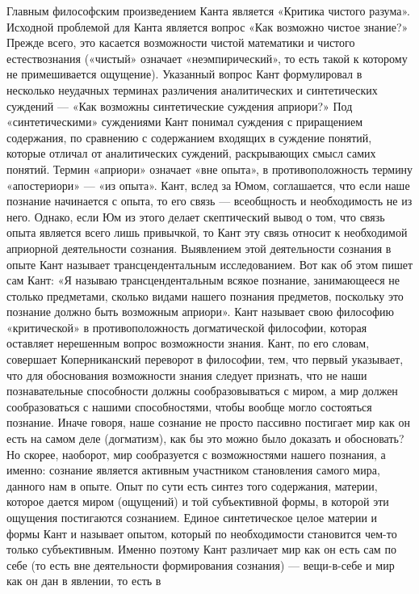 \documentclass[12pt]{article}
\begin{document}
Главным философским произведением Канта является «Критика чистого разума». Исходной проблемой для
Канта  является  вопрос  «Как  возможно  чистое  знание?»  Прежде  всего,  это  касается  возможности  чистой
математики и чистого естествознания («чистый» означает «неэмпирический», то есть такой к которому не
примешивается  ощущение).  Указанный  вопрос  Кант  формулировал  в  несколько  неудачных  терминах
различения аналитических и синтетических суждений — «Как возможны синтетические суждения априори?»
Под  «синтетическими»  суждениями  Кант  понимал  суждения  с  приращением  содержания,  по  сравнению  с
содержанием  входящих в  суждение понятий, которые  отличал от  аналитических суждений, раскрывающих
смысл самих понятий. Термин «априори» означает «вне опыта», в противоположность термину «апостериори»
— «из опыта». Кант, вслед за Юмом, соглашается, что если наше познание начинается с опыта, то его связь —
всеобщность и необходимость не из него. Однако, если Юм из этого делает скептический вывод о том, что связь
опыта является всего лишь привычкой, то Кант эту связь относит к необходимой априорной деятельности
сознания. Выявлением этой деятельности сознания в опыте Кант называет трансцендентальным исследованием.
Вот как об этом пишет сам Кант: «Я называю трансцендентальным всякое познание, занимающееся не столько
предметами, сколько видами нашего познания предметов, поскольку это познание должно быть возможным
априори». Кант называет свою философию «критической» в противоположность догматической философии,
которая оставляет нерешенным вопрос возможности знания. Кант, по его словам, совершает Коперниканский
переворот в философии, тем, что первый указывает, что для обоснования возможности знания следует признать,
что не наши познавательные способности должны сообразовываться с миром, а мир должен сообразоваться с
нашими способностями, чтобы вообще могло состояться познание. Иначе говоря, наше сознание не просто
пассивно постигает мир как он есть на самом деле (догматизм), как бы это можно было доказать и обосновать?
Но  скорее,  наоборот,  мир  сообразуется  с  возможностями  нашего  познания,  а  именно:  сознание  является
активным  участником  становления  самого  мира,  данного  нам  в  опыте.  Опыт  по  сути  есть  синтез  того
содержания, материи, которое дается миром (ощущений) и той субъективной формы, в которой эти ощущения
постигаются сознанием. Единое синтетическое целое материи и формы Кант и называет опытом, который по
необходимости становится чем-то только субъективным. Именно поэтому Кант различает мир как он есть сам
по себе (то есть вне деятельности формирования сознания) — вещи-в-себе и мир как он дан в явлении, то есть в
\end{document}
